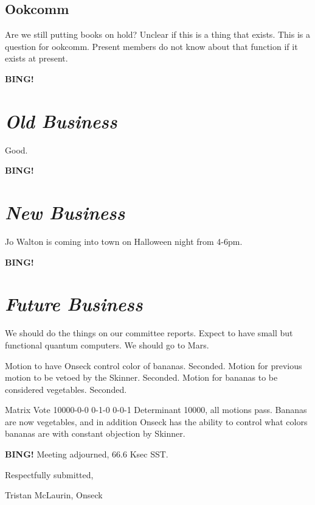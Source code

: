 \documentclass[10pt]{article}
\newcommand{\bing}{{\bf BING!} }
\newcommand{\goto}[1]{\bing \vskip 12pt \section*{{\em{#1}}}}
\newcommand{\onseck}{Tristan McLaurin, Onseck}
\begin{document}
\subsection*{Ookcomm}
Are we still putting books on hold? Unclear if this is a thing that exists. This is a question for ookcomm. Present members do not know about that function if it exists at present.

\goto{Old Business}
Good.

\goto{New Business}
Jo Walton is coming into town on Halloween night from 4-6pm.

\goto{Future Business}
We should do the things on our committee reports. Expect to have small but functional quantum computers. We should go to Mars. 

Motion to have Onseck control color of bananas. Seconded.
Motion for previous motion to be vetoed by the Skinner. Seconded.
Motion for bananas to be considered vegetables. Seconded.

Matrix Vote
10000-0-0
0-1-0
0-0-1
Determinant 10000, all motions pass. Bananas are now vegetables, and in addition Onseck has the ability to control what colors bananas are with constant objection by Skinner.

\bing
\noindent
Meeting adjourned, 66.6 Ksec SST.

\vspace{18pt}

\centerline{Respectfully submitted,}
\centerline{\onseck}
\end{document}

